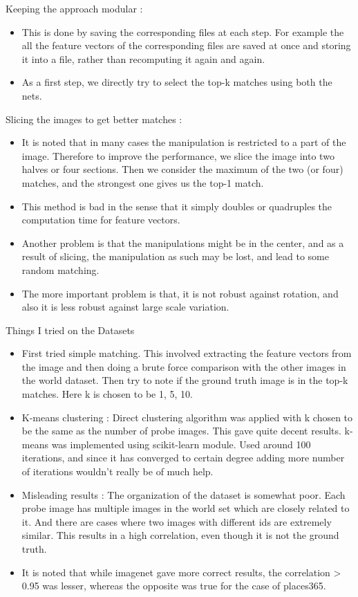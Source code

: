 \documentclass{article}
\begin{document}
Keeping the approach modular :
\begin{itemize}
\item This is done by saving the corresponding files at each step. For example the all the feature vectors of the corresponding files are saved at once and storing it into a file, rather than recomputing it again and again.
\item As a first step, we directly try to select the top-k matches using both the nets.
\end{itemize}

Slicing the images to get better matches :
\begin{itemize}
\item It is noted that in many cases the manipulation is restricted to a part of the image. Therefore to improve the performance, we slice the image into two halves or four sections. Then we consider the maximum of the two (or four) matches, and the strongest one gives us the top-1 match.
\item This method is bad in the sense that it simply doubles or quadruples the computation time for feature vectors.
\item Another problem is that the manipulations might be in the center, and as a result of slicing, the manipulation as such may be lost, and lead to some random matching.
\item The more important problem is that, it is not robust against rotation, and also it is less robust against large scale variation.
\end{itemize}

Things I tried on the Datasets
\begin{itemize}
\item First tried simple matching. This involved extracting the feature vectors from the image and then doing a brute force comparison with the other images in the world dataset. Then try to note if the ground truth image is in the top-k matches. Here k is chosen to be 1, 5, 10.
\item K-means clustering : Direct clustering algorithm was applied with k chosen to be the same as the number of probe images. This gave quite decent results. k-means was implemented using scikit-learn module. Used around 100 iterations, and since it has converged to certain degree adding more number of iterations wouldn't really be of much help.
\item Misleading results : The organization of the dataset is somewhat poor. Each probe image has multiple images in the world set which are closely related to it. And there are cases where two images with different ids are extremely similar. This results in a high correlation, even though it is not the ground truth.
\item It is noted that while imagenet gave more correct results, the correlation > 0.95 was lesser, whereas the opposite was true for the case of places365.
\end{itemize}
\end{document}
